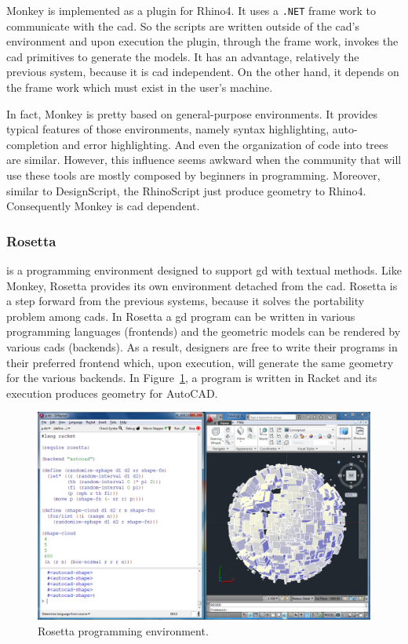 Monkey is implemented as a plugin for Rhino4. It uses a \texttt{.NET} frame work to communicate with the \ac{cad}. So the scripts are written outside of the \ac{cad}'s environment and upon execution the plugin, through the frame work, invokes the \ac{cad} primitives to generate the models. It has an advantage, relatively the previous system, because it is \ac{cad} independent. On the other hand, it depends on the frame work which must exist in the user's machine.

In fact, Monkey is pretty based on general-purpose environments. It provides typical features of those environments, namely syntax highlighting, auto-completion and error highlighting. And even the organization of code into trees are similar. However, this influence seems awkward when the community that will use these tools are mostly composed by beginners in programming. Moreover, similar to DesignScript, the RhinoScript just produce geometry to Rhino4. Consequently Monkey is \ac{cad} dependent. 
\subsubsection{Rosetta~\cite{lopes2011portable}} is a programming environment designed to support \ac{gd} with textual methods. Like Monkey, Rosetta provides its own environment detached from the \ac{cad}. Rosetta is a step forward from the previous systems, because it solves the portability problem among \ac{cad}s. In Rosetta a \ac{gd} program can be written in various programming languages (frontends) and the geometric models can be rendered by various \ac{cad}s (backends). As a result, designers are free to write their programs in their preferred frontend which, upon execution, will generate the same geometry for the various backends. In Figure~\ref{fig:rosetta}, a program is written in Racket and its execution produces geometry for AutoCAD.

\begin{figure}[!htbp]
  \centering
  \includegraphics[width=1.0\textwidth]{img/rosetta1}
    \caption{Rosetta programming environment.}  
  \label{fig:rosetta}
\end{figure} 

